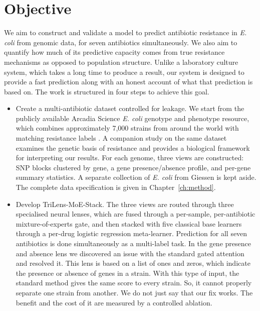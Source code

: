 \section{Objective}
We aim to construct and validate a model to predict antibiotic resistance in \textit{E. coli} from genomic data, for seven antibiotics simultaneously. We also aim to quantify how much of its predictive capacity comes from true resistance mechanisms as opposed to population structure. Unlike a laboratory culture system, which takes a long time to produce a result, our system is designed to provide a fast prediction along with an honest account of what that prediction is based on. The work is structured in four steps to achieve this goal.

\medskip
\begin{itemize}
    \item Create a multi-antibiotic dataset controlled for leakage. We start from the publicly available Arcadia Science \textit{E. coli} genotype and phenotype resource, which combines approximately 7,000 strains from around the world with matching resistance labels \cite{morin2024ecoli}. A companion study on the same dataset \cite{york2025amr} examines the genetic basis of resistance and provides a biological framework for interpreting our results. For each genome, three views are constructed: SNP blocks clustered by gene, a gene presence/absence profile, and per-gene summary statistics. A separate collection of \textit{E. coli} from Giessen is kept aside. The complete data specification is given in Chapter~\ref{ch:method}.

    \item Develop TriLens-MoE-Stack. The three views are routed through three specialised neural lenses, which are fused through a per-sample, per-antibiotic mixture-of-experts gate, and then stacked with five classical base learners through a per-drug logistic regression meta-learner. Prediction for all seven antibiotics is done simultaneously as a multi-label task. In the gene presence and absence lens we discovered an issue with the standard gated attention and resolved it. This lens is based on a list of ones and zeros, which indicate the presence or absence of genes in a strain. With this type of input, the standard method gives the same score to every strain. So, it cannot properly separate one strain from another. We do not just say that our fix works. The benefit and the cost of it are measured by a controlled ablation.


\end{itemize}
